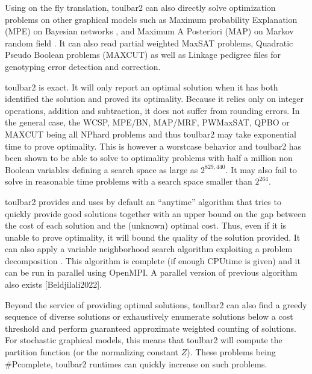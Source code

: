 \documentclass[letterpaper,10pt,openany,oneside,english]{sphinxmanual}
\begin{document}
\sphinxAtStartPar
Using on the fly translation, toulbar2 can also directly solve
optimization problems on other graphical models such as Maximum
probability Explanation (MPE) on Bayesian networks , and
Maximum A Posteriori (MAP) on Markov random field . It can also
read partial weighted MaxSAT problems, Quadratic Pseudo Boolean
problems (MAXCUT) as well as Linkage  pedigree files for
genotyping error detection and correction.

\sphinxAtStartPar
toulbar2 is exact. It will only report an optimal solution when it
has both identified the solution and proved its optimality. Because it
relies only on integer operations, addition and subtraction, it does
not suffer from rounding errors. In the general case, the WCSP,
MPE/BN, MAP/MRF, PWMaxSAT, QPBO or MAXCUT being all NP\sphinxhyphen{}hard problems
and thus toulbar2 may take exponential time to prove optimality. This
is however a worst\sphinxhyphen{}case behavior and toulbar2 has been shown to be
able to solve to optimality problems with half a million non Boolean
variables defining a search space as large as \(2^{829,440}\). It may
also fail to solve in reasonable time problems with a search space
smaller than \(2^{264}\).

\sphinxAtStartPar
toulbar2 provides and uses by default an “anytime”
algorithm  that tries to quickly provide good solutions together
with an upper bound on the gap between the cost of each solution and
the (unknown) optimal cost. Thus, even if it is unable to prove
optimality, it will bound the quality of the solution provided.
It can also apply a variable neighborhood search algorithm exploiting a problem decomposition .
This algorithm is complete (if enough CPU\sphinxhyphen{}time is given) and it can be run in parallel using OpenMPI.
A parallel version of previous algorithm also exists {[}Beldjilali2022{]}.

\sphinxAtStartPar
Beyond the service of providing optimal solutions, toulbar2 can also find a greedy sequence of diverse solutions  or
exhaustively enumerate solutions below a cost threshold and
perform guaranteed approximate weighted counting of solutions. For
stochastic graphical models, this means that toulbar2 will compute
the partition function (or the normalizing constant \(Z\)). These
problems being \#P\sphinxhyphen{}complete, toulbar2 runtimes can quickly increase
on such problems.
\end{document}
